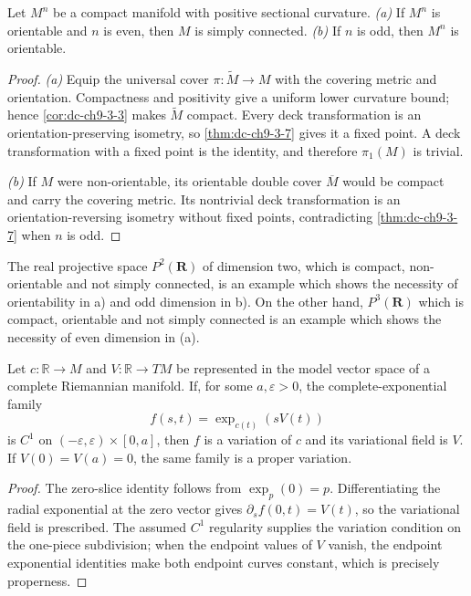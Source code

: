 \begin{corollary}[Synge]
  \label{cor:dc-ch9-3-10}
  Let $M^n$ be a compact manifold with positive sectional curvature.
  \emph{(a)} If $M^n$ is orientable and $n$ is even, then $M$ is simply connected.
  \emph{(b)} If $n$ is odd, then $M^n$ is orientable.
\end{corollary}
\begin{proof}
  \sketch
  \emph{(a)} Equip the universal cover $\pi:\tilde M\to M$ with the
  covering metric and orientation. Compactness and positivity give a uniform
  lower curvature bound; hence \cref{cor:dc-ch9-3-3} makes $\tilde M$
  compact. Every deck transformation is an orientation-preserving isometry, so
  \cref{thm:dc-ch9-3-7} gives it a fixed point. A deck transformation with a
  fixed point is the identity, and therefore $\pi_1(M)$ is trivial.

  \emph{(b)} If $M$ were non-orientable, its orientable double cover
  $\overline M$ would be compact and carry the covering metric. Its nontrivial
  deck transformation is an orientation-reversing isometry without fixed
  points, contradicting \cref{thm:dc-ch9-3-7} when $n$ is odd.
\end{proof}
\begin{remark}
  \label{rem:dc-ch9-3-11}
  The real projective space $P^2(\mathbf{R})$ of dimension two, which is compact,
  non-orientable and not simply connected, is an example which shows the necessity of
  orientability in a) and odd dimension in b). On the other hand, $P^3(\mathbf{R})$
  which is compact, orientable and not simply connected is an example which shows the
  necessity of even dimension in (a).
\end{remark}

\begin{lemma}
  \label{lem:dc-ch9-2-2-exponential}


  Let $c:\mathbb R\to M$ and $V:\mathbb R\to TM$ be represented in the model
  vector space of a complete Riemannian manifold.  If, for some $a,\varepsilon>0$,
  the complete-exponential family
  $$f(s,t)=\exp_{c(t)}(sV(t))$$
  is $C^1$ on $(-\varepsilon,\varepsilon)\times[0,a]$, then $f$ is a variation of
  $c$ and its variational field is $V$.  If $V(0)=V(a)=0$, the same family is a
  proper variation.
\end{lemma}
\begin{proof}

  The zero-slice identity follows from $\exp_p(0)=p$.  Differentiating the radial
  exponential at the zero vector gives
  $\partial_s f(0,t)=V(t)$, so the variational field is prescribed.  The assumed
  $C^1$ regularity supplies the variation condition on the one-piece subdivision;
  when the endpoint values of $V$ vanish, the endpoint exponential identities make
  both endpoint curves constant, which is precisely properness.
\end{proof}

